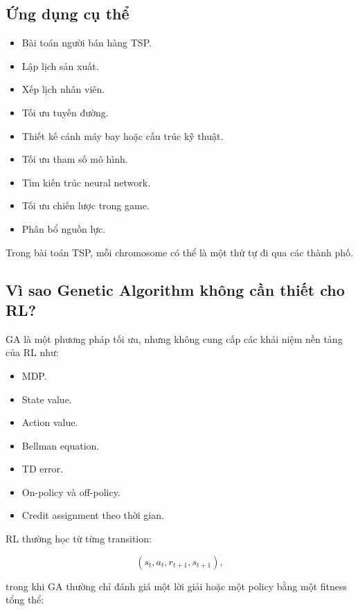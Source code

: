 \documentclass[12pt,a4paper]{report}
\begin{document}
\subsection{Ứng dụng cụ thể}

\begin{itemize}[leftmargin=1.5em]
    \item Bài toán người bán hàng TSP.
    \item Lập lịch sản xuất.
    \item Xếp lịch nhân viên.
    \item Tối ưu tuyến đường.
    \item Thiết kế cánh máy bay hoặc cấu trúc kỹ thuật.
    \item Tối ưu tham số mô hình.
    \item Tìm kiến trúc neural network.
    \item Tối ưu chiến lược trong game.
    \item Phân bổ nguồn lực.
\end{itemize}

Trong bài toán TSP, mỗi chromosome có thể là một thứ tự đi qua các thành phố.

\subsection{Vì sao Genetic Algorithm không cần thiết cho RL?}

GA là một phương pháp tối ưu, nhưng không cung cấp các khái niệm nền tảng của RL như:

\begin{itemize}[leftmargin=1.5em]
    \item MDP.
    \item State value.
    \item Action value.
    \item Bellman equation.
    \item TD error.
    \item On-policy và off-policy.
    \item Credit assignment theo thời gian.
\end{itemize}

RL thường học từ từng transition:

\begin{equation}
(s_t,a_t,r_{t+1},s_{t+1}),
\end{equation}

trong khi GA thường chỉ đánh giá một lời giải hoặc một policy bằng một fitness tổng thể:
\end{document}
